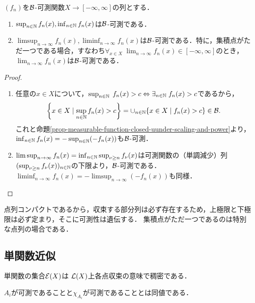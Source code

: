 \documentclass[uplatex, dvipdfmx]{jsreport}
\begin{document}
\begin{proposition}[極限構成]\label{prop-limit-of-sequence-of-measurable-function}
    $(f_n)$を$\mathcal{B}$-可測関数$X\to[-\infty,\infty]$の列とする．
    \begin{enumerate}
        \item $\sup_{n\in\mathbb{N}}f_n(x),\inf_{n\in\mathbb{N}}f_n(x)$は$\mathcal{B}$-可測である．
        \item $\limsup_{n\to\infty}f_n(x),\liminf_{n\to\infty}f_n(x)$は$\mathcal{B}$-可測である．特に，集積点がただ一つである場合，すなわち$\forall_{x\in X}\;\lim_{n\to\infty}f_n(x)\in[-\infty,\infty]$のとき，$\lim_{n\to\infty}f_n(x)$は$\mathcal{B}$-可測である．
    \end{enumerate}
\end{proposition}
\begin{proof}\mbox{}
    \begin{enumerate}
        \item 任意の$x\in X$について，$\sup_{n\in\mathbb{N}}\;f_n(x)>c\Leftrightarrow\exists_{n\in\mathbb{N}}\;f_n(x)>c$であるから，
        \[\left\{x\in X\mid\sup_{n\in\mathbb{N}}f_n(x)>c\right\}=\cup_{n\in\mathbb{N}}\{x\in X\mid f_n(x)>c\}\in\mathcal{B}.\]
        これと命題\ref{prop-measurable-function-closed-uunder-scaling-and-power}より，$\inf_{n\in\mathbb{N}}f_n(x)=-\sup_{n\in\mathbb{N}}(-f_n(x))$も$\mathcal{B}$-可測．
        \item 
        $\limsup_{n\to\infty}f_n(x)=\inf_{n\in\mathbb{N}}\sup_{\nu\ge n}f_\nu(x)$は可測関数の（単調減少）列$(\sup_{\nu\ge n}f_\nu(x))_{n\in\mathbb{N}}$の下限より，$\mathcal{B}$-可測である．
        $\liminf_{n\to\infty}f_n(x)=-\limsup_{n\to\infty}(-f_n(x))$も同様．
    \end{enumerate}
\end{proof}
\begin{remarks}
    点列コンパクトであるから，収束する部分列は必ず存在するため，上極限と下極限は必ず定まり，そこに可測性は遺伝する．
    集積点がただ一つであるのは特別な点列の場合である．
\end{remarks}

\subsection{単関数近似}

\begin{tcolorbox}[colframe=ForestGreen, colback=ForestGreen!10!white,breakable,colbacktitle=ForestGreen!40!white,coltitle=black,fonttitle=\bfseries\sffamily,
title=]
    単関数の集合$\mathcal{E}(X)$は
    $\mathcal{L}(X)$上各点収束の意味で稠密である．
    
    $A_i$が可測であることと$\chi_{A_i}$が可測であることとは同値である．
\end{tcolorbox}
\end{document}
